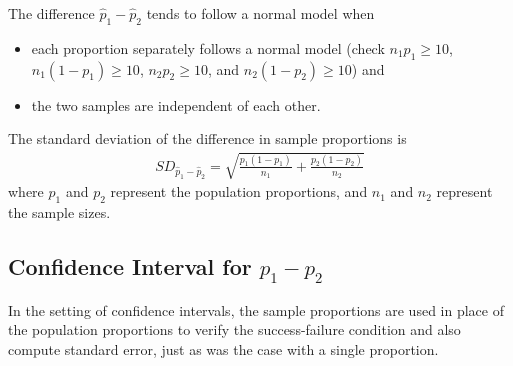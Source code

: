 \begin{termBox}{
The difference $\hat{p}_1 - \hat{p}_2$ tends to follow a normal model when
\begin{itemize}
\setlength{\itemsep}{0mm}
\item each proportion separately follows a normal model (check $n_1p_1 \geq 10$, $n_1(1-p_1) \geq 10$, $n_2p_2 \geq 10$, and $n_2(1-p_2) \geq 10$) and
\item the two samples are independent of each other.
\end{itemize}
The standard deviation of the difference in sample proportions is
\begin{eqnarray}
SD_{\hat{p}_1 - \hat{p}_2}
	= \sqrt{\frac{p_1(1-p_1)}{n_1} + \frac{p_2(1-p_2)}{n_2}}
\label{sdForDiffOfProp}
\end{eqnarray}
where $p_1$ and $p_2$ represent the population proportions, and $n_1$ and $n_2$ represent the sample sizes.}
\end{termBox}


\textA{\newpage}

\subsection{Confidence Interval for $p_1 -p_2$}

In the setting of confidence intervals, the sample proportions are used in place of the population proportions to verify the success-failure condition and also compute standard error, just as was the case with a single proportion.

